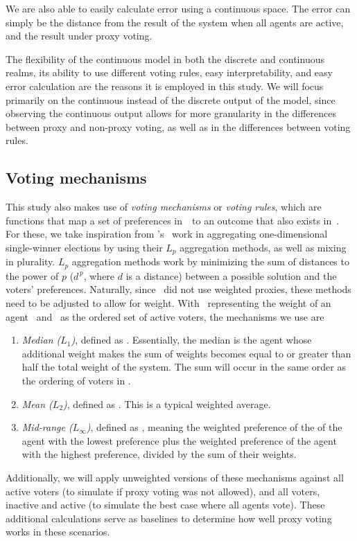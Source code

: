 We are also able to easily calculate error using a continuous space.
The error can simply be the distance from the result of the system when all agents
are active, and the result under proxy voting.

The flexibility of the continuous model in both the discrete and continuous realms, its
ability to use different voting rules, easy interpretability, and easy error
calculation are the reasons it is employed in this study.
We will focus primarily on the continuous instead of the discrete output of the
model, since observing the continuous output allows for more granularity in the
differences between proxy and non-proxy voting, as well as in the differences between
voting rules.

\subsection{Voting mechanisms}\label{subsec:voting-mechanisms}
This study also makes use of \textit{voting mechanisms} or \textit{voting rules},
which are functions that map a set of preferences in~\systemspace\ to an outcome that
also exists in~\systemspace.
For these, we take inspiration from 's~\cite{Bulteau2021} work in
aggregating one-dimensional single-winner elections by using their $L_p$ aggregation
methods, as well as mixing in plurality.
$L_p$ aggregation methods work by minimizing the sum of distances to the power of $p$
($d^{\,p}$, where $d$ is a distance) between a possible solution and the voters'
preferences.
Naturally, since~\cite{Bulteau2021} did not use weighted proxies, these methods need
to be adjusted to allow for weight.
With \agentweight\ representing the weight of an agent \agent\ and \systemproxies\ as
the ordered set of active voters, the mechanisms we use are
\begin{enumerate}
    \item {
        \textit{Median ($L_1$)}, defined as
        $$.
        Essentially, the median is the agent whose additional weight makes the sum of
        weights becomes equal to or greater than half the total weight of the system.
        The sum will occur in the same order as the ordering of voters in
        \systemproxies.
    }
    \item {
        \textit{Mean ($L_2$)}, defined as
        $$.
        This is a typical weighted average.
    }
    \item {
        \textit{Mid-range ($L_\infty$)}, defined as
        $$, meaning the weighted
        preference of the of the agent with the lowest preference plus the weighted
        preference of the agent with the highest preference, divided by the sum of
        their weights.
    }
\end{enumerate}
Additionally, we will apply unweighted versions of these mechanisms against all active
voters (to simulate if proxy voting was not allowed), and all voters, inactive and
active (to simulate the best case where all agents vote).
These additional calculations serve as baselines to determine how well proxy voting
works in these scenarios.

